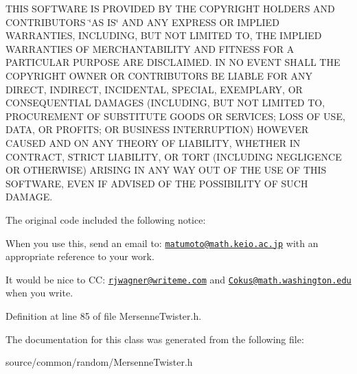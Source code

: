 T\-H\-I\-S S\-O\-F\-T\-W\-A\-R\-E I\-S P\-R\-O\-V\-I\-D\-E\-D B\-Y T\-H\-E C\-O\-P\-Y\-R\-I\-G\-H\-T H\-O\-L\-D\-E\-R\-S A\-N\-D C\-O\-N\-T\-R\-I\-B\-U\-T\-O\-R\-S \char`\"{}\-A\-S I\-S\char`\"{} A\-N\-D A\-N\-Y E\-X\-P\-R\-E\-S\-S O\-R I\-M\-P\-L\-I\-E\-D W\-A\-R\-R\-A\-N\-T\-I\-E\-S, I\-N\-C\-L\-U\-D\-I\-N\-G, B\-U\-T N\-O\-T L\-I\-M\-I\-T\-E\-D T\-O, T\-H\-E I\-M\-P\-L\-I\-E\-D W\-A\-R\-R\-A\-N\-T\-I\-E\-S O\-F M\-E\-R\-C\-H\-A\-N\-T\-A\-B\-I\-L\-I\-T\-Y A\-N\-D F\-I\-T\-N\-E\-S\-S F\-O\-R A P\-A\-R\-T\-I\-C\-U\-L\-A\-R P\-U\-R\-P\-O\-S\-E A\-R\-E D\-I\-S\-C\-L\-A\-I\-M\-E\-D. I\-N N\-O E\-V\-E\-N\-T S\-H\-A\-L\-L T\-H\-E C\-O\-P\-Y\-R\-I\-G\-H\-T O\-W\-N\-E\-R O\-R C\-O\-N\-T\-R\-I\-B\-U\-T\-O\-R\-S B\-E L\-I\-A\-B\-L\-E F\-O\-R A\-N\-Y D\-I\-R\-E\-C\-T, I\-N\-D\-I\-R\-E\-C\-T, I\-N\-C\-I\-D\-E\-N\-T\-A\-L, S\-P\-E\-C\-I\-A\-L, E\-X\-E\-M\-P\-L\-A\-R\-Y, O\-R C\-O\-N\-S\-E\-Q\-U\-E\-N\-T\-I\-A\-L D\-A\-M\-A\-G\-E\-S (I\-N\-C\-L\-U\-D\-I\-N\-G, B\-U\-T N\-O\-T L\-I\-M\-I\-T\-E\-D T\-O, P\-R\-O\-C\-U\-R\-E\-M\-E\-N\-T O\-F S\-U\-B\-S\-T\-I\-T\-U\-T\-E G\-O\-O\-D\-S O\-R S\-E\-R\-V\-I\-C\-E\-S; L\-O\-S\-S O\-F U\-S\-E, D\-A\-T\-A, O\-R P\-R\-O\-F\-I\-T\-S; O\-R B\-U\-S\-I\-N\-E\-S\-S I\-N\-T\-E\-R\-R\-U\-P\-T\-I\-O\-N) H\-O\-W\-E\-V\-E\-R C\-A\-U\-S\-E\-D A\-N\-D O\-N A\-N\-Y T\-H\-E\-O\-R\-Y O\-F L\-I\-A\-B\-I\-L\-I\-T\-Y, W\-H\-E\-T\-H\-E\-R I\-N C\-O\-N\-T\-R\-A\-C\-T, S\-T\-R\-I\-C\-T L\-I\-A\-B\-I\-L\-I\-T\-Y, O\-R T\-O\-R\-T (I\-N\-C\-L\-U\-D\-I\-N\-G N\-E\-G\-L\-I\-G\-E\-N\-C\-E O\-R O\-T\-H\-E\-R\-W\-I\-S\-E) A\-R\-I\-S\-I\-N\-G I\-N A\-N\-Y W\-A\-Y O\-U\-T O\-F T\-H\-E U\-S\-E O\-F T\-H\-I\-S S\-O\-F\-T\-W\-A\-R\-E, E\-V\-E\-N I\-F A\-D\-V\-I\-S\-E\-D O\-F T\-H\-E P\-O\-S\-S\-I\-B\-I\-L\-I\-T\-Y O\-F S\-U\-C\-H D\-A\-M\-A\-G\-E.

The original code included the following notice\-:

When you use this, send an email to\-: \href{mailto:matumoto@math.keio.ac.jp}{\tt matumoto@math.\-keio.\-ac.\-jp} with an appropriate reference to your work.

It would be nice to C\-C\-: \href{mailto:rjwagner@writeme.com}{\tt rjwagner@writeme.\-com} and \href{mailto:Cokus@math.washington.edu}{\tt Cokus@math.\-washington.\-edu} when you write. 

Definition at line 85 of file Mersenne\-Twister.\-h.



The documentation for this class was generated from the following file\-:\begin{DoxyCompactItemize}
\item 
source/common/random/Mersenne\-Twister.\-h\end{DoxyCompactItemize}
